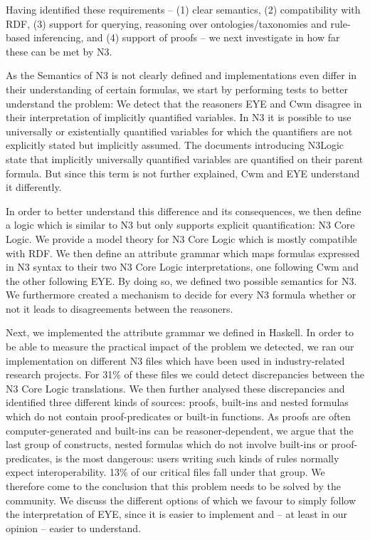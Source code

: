 Having identified these requirements -- (1) clear semantics, (2) compatibility with RDF, (3) support for querying, reasoning over ontologies/taxonomies and 
rule-based inferencing, and
(4) support of proofs -- we next investigate in how far these can be met by N3.

As the Semantics of N3 is not clearly defined and implementations even differ in their understanding of certain formulas, we start by performing tests to better understand the 
problem: We detect that the reasoners EYE and Cwm disagree in their interpretation of implicitly quantified variables. In N3 it is possible to use universally or 
existentially quantified variables for which the quantifiers are not explicitly stated but implicitly assumed. The documents 
introducing N3Logic state that implicitly universally quantified variables are quantified on their parent formula. But since this term 
is not further explained, Cwm and EYE understand it differently.

In order to better understand this difference and its consequences, we then define a logic which is similar to N3 but only supports explicit quantification: N3 Core Logic.
We provide a model theory for N3 Core Logic which is mostly compatible with RDF. We then define an attribute grammar which maps formulas expressed in N3 syntax to their two
N3 Core Logic interpretations, one following Cwm and the other following EYE. By doing so, we defined two possible semantics for N3. 
We furthermore created a mechanism to decide for every N3 formula whether or not it leads to disagreements between the reasoners.

Next, we implemented the attribute grammar we defined in Haskell. In order to be able to measure the practical impact of the problem we detected, we ran our 
implementation on different N3 files which have been used in industry-related research projects. For 31\% of these files we could detect discrepancies between the 
N3 Core Logic translations. We then further analysed these discrepancies and identified three different kinds of sources: proofs, built-ins and nested formulas 
which do not contain proof-predicates or built-in functions. 
As proofs are often computer-generated and  built-ins can be reasoner-dependent,
we argue that the last group of constructs, nested formulas which do not involve built-ins or proof-predicates, is the most dangerous:
users writing such kinds of rules normally expect interoperability. 13\% of our critical files fall under that group.
We therefore come to the conclusion that this problem needs to be solved by the community. We discuss the different options of which we favour 
to simply follow the interpretation of EYE, since it is easier to implement and -- at least in our opinion -- easier to understand.


